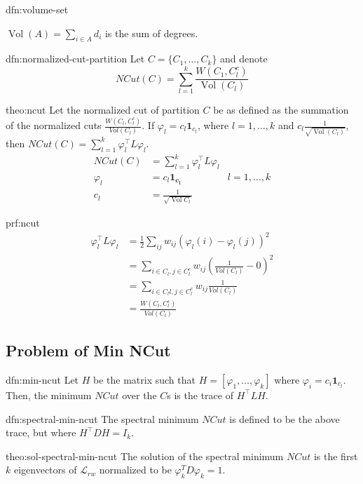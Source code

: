 \documentclass[12pt]{article}
\theoremstyle{plain}
\DeclareMathOperator*{\vol}{Vol}
\begin{document}
\begin{dfn}{dfn:volume-set}

$ \vol(A) = \sum_{i \in A} d_i $ is the sum of degrees.

\end{dfn}

\begin{dfn}{dfn:normalized-cut-partition}
Let $ C = \{ C_1, \ldots, C_k \} $ and denote
\[
NCut(C) = \sum_{l = 1}^k \frac{W(C_1, C_l^c) }{ \vol{(C_l)} }
\]

\end{dfn}

\begin{theo}[NCut]{theo:ncut}
Let the normalized cut of partition $C$ be as defined as the summation of the normalized cuts $\frac{W(C_l, C_l^c)}{Vol(C_l)}$. If $\varphi_l = c_{l} \mathbf{1}_{c_{l}}$, where $l = 1, \ldots, k$ and $c_l \frac{1}{\sqrt{\vol{(C_l)}}}$, then $NCut(C) = \sum_{l = 1}^{k} \varphi_l^{\intercal} L \varphi_{l}$.
  \begin{align*}
    NCut(C) &= \sum_{l = 1}^{k} \varphi_l^{\intercal} L \varphi_{l} \\
    \varphi_l &= c_{l} \mathbf{1_{c_{l}}} & l = 1, \ldots, k \\
    c_l &= \frac{1}{\sqrt{\vol{C_l}}}
	\end{align*}
\end{theo}

\begin{prf}{prf:ncut}
	\begin{align*}
		\varphi_l^{\intercal} L \varphi_{l} &= \frac{1}{2} \sum_{ij} w_{ij}(\varphi_l(i) - \varphi_l(j))^2 \\
		&= \sum_{i \in C_l, j \in C_l^c} w_{ij} (\frac{1}{Vol(C_l)} - 0)^2 \\
		&= \sum_{i \in C_ll, j \in C_l^c} w_{ij} \frac{1}{Vol(C_l)} \\
		&= \frac{W(C_l,C_l^c)}{Vol(C_l)}
	\end{align*}
\end{prf}

\subsection{Problem of Min NCut}
\begin{dfn}{dfn:min-ncut}
	Let $ H $ be the matrix such that $ H = [\varphi_1, \ldots, \varphi_k] $ where $\varphi_i = c_i \mathbf{1}_{c_{l}} $. 
	Then, the minimum $ NCut $ over the $ C $s is the trace of $ H^{\intercal} L H $.
\end{dfn}
\begin{dfn}{dfn:spectral-min-ncut}
The spectral minimum $ NCut $ is defined to be the above trace, but where $ H^{\intercal} D H = I_{k} $.
\end{dfn}
\begin{theo}{theo:sol-spectral-min-ncut}
  The solution of the spectral minimum $ NCut $ is the first $ k $ eigenvectors of $ \mathcal{L}_{rw} $ normalized to be $\varphi_k^T D \varphi_k = 1$. 
\end{theo}
\end{document}
